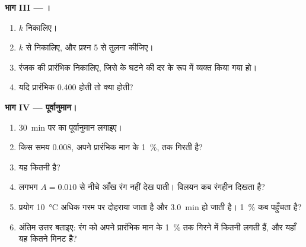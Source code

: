 \begin{problem}
\medskip
\noindent\textbf{भाग III --- ।}
\begin{enumerate}[resume]
  \item $k$ निकालिए।
  \item $k$ से  निकालिए, और प्रश्न 5 से तुलना कीजिए।
  \item रंजक की प्रारंभिक  निकालिए, जिसे
         के घटने की दर के रूप में व्यक्त किया गया हो।
  \item यदि प्रारंभिक  0.400 होती तो  क्या होती?
\end{enumerate}

\medskip
\noindent\textbf{भाग IV --- पूर्वानुमान।}
\begin{enumerate}[resume]
  \item \qty{30}{min} पर  का पूर्वानुमान लगाइए।
  \item {} किस समय 0.008, अपने प्रारंभिक मान के \qty{1}{\percent}, तक
        गिरती है?
  \item यह कितनी  है?
  \item लगभग $A = 0.010$ से नीचे आँख रंग नहीं देख पाती। विलयन कब
        रंगहीन दिखता है?
  \item प्रयोग \qty{10}{\celsius} अधिक गरम पर दोहराया जाता है और
         \qty{3.0}{min} हो जाती है। \qty{1}{\percent} कब
        पहुँचता है?
  \item अंतिम उत्तर बताइए: रंग को अपने प्रारंभिक मान के \qty{1}{\percent} तक गिरने में
        कितनी  लगती हैं, और यहाँ यह कितने मिनट
        है?
\end{enumerate}
\end{problem}
